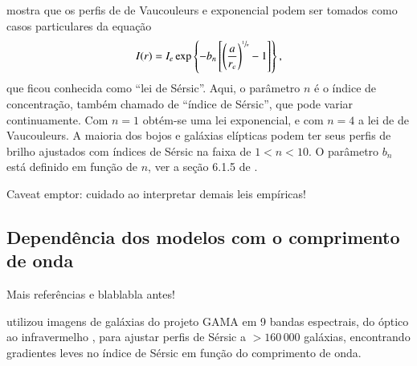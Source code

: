 \citet{Sersic1963} mostra que os perfis de de Vaucouleurs e exponencial podem
ser tomados como casos particulares da equação
\begin{equation*}
I(r) = I_e \exp \left\{- b_n \left[ \left( \frac{a}{r_e} \right)^{\sfrac{1}{n}}
- 1 \right] \right\},
\end{equation*}
que ficou conhecida como ``lei de Sérsic''. Aqui, o parâmetro $n$ é o índice de
concentração, também chamado de ``índice de Sérsic'', que pode variar
continuamente. Com $n=1$ obtém-se uma lei exponencial, e com $n=4$ a lei de de
Vaucouleurs. A maioria dos bojos e galáxias elípticas podem ter seus perfis
de brilho ajustados com índices de Sérsic na faixa de $1 < n < 10$. O parâmetro
$b_n$ está definido em função de $n$, ver a seção 6.1.5 de \citet{Erwin2015}.

\TODO Caveat emptor: cuidado ao interpretar demais leis empíricas!


\subsection{Dependência dos modelos com o comprimento de onda}
\label{sec:morph:comp:depLambda}

\TODO Mais referências e blablabla antes!

\citet{Kelvin2012} utilizou imagens de galáxias do projeto GAMA
\citep{Driver2009} em 9 bandas espectrais, do óptico \citep[bandas $ugriz$ do
DR7]{Abazajian2009} ao infravermelho \citep[bandas $YJHK$ do
UKIDSS]{Lawrence2007}, para ajustar perfis de Sérsic a $>160\,000$ galáxias,
encontrando gradientes leves no índice de Sérsic em função do comprimento de
onda.

